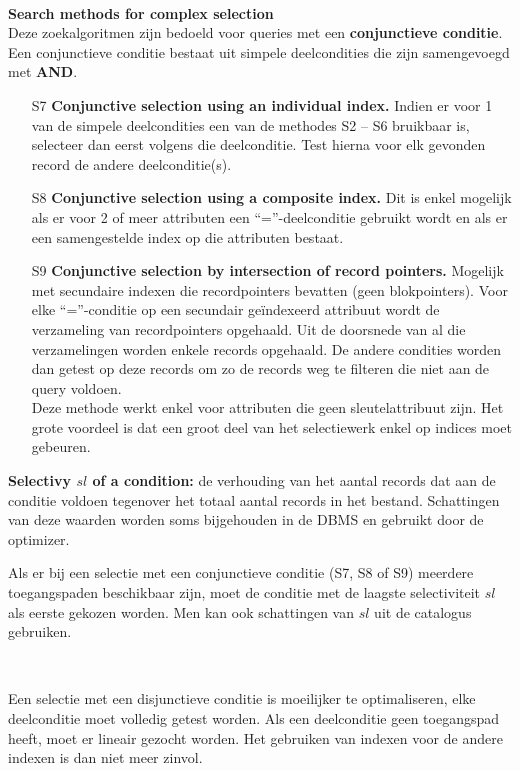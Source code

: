 ~

\noindent \textbf{Search methods for complex selection}\\
Deze zoekalgoritmen zijn bedoeld voor queries met een \textbf{conjunctieve conditie}. Een conjunctieve conditie bestaat uit simpele deelcondities die zijn samengevoegd met \textbf{AND}.
\begin{itemize}
	\item[S7] \textbf{Conjunctive selection using an individual index.} Indien er voor 1 van de simpele deelcondities een van de methodes S2 -- S6 bruikbaar is, selecteer dan eerst volgens die deelconditie. Test hierna voor elk gevonden record de andere deelconditie(s).
	
	\item[S8] \textbf{Conjunctive selection using a composite index.} Dit is enkel mogelijk als er voor 2 of meer attributen een ``=''-deelconditie gebruikt wordt en als er een samengestelde index op die attributen bestaat.

	\item[S9] \textbf{Conjunctive selection by intersection of record pointers.} Mogelijk met secundaire indexen die recordpointers bevatten (geen blokpointers). Voor elke ``=''-conditie op een secundair ge\"indexeerd attribuut wordt de verzameling van recordpointers opgehaald. Uit de doorsnede van al die verzamelingen worden enkele records opgehaald. De andere condities worden dan getest op deze records om zo de records weg te filteren die niet aan de query voldoen.\\	
Deze methode werkt enkel voor attributen die geen sleutelattribuut zijn. Het grote voordeel is dat een groot deel van het selectiewerk enkel op indices moet gebeuren.
\end{itemize}
\textbf{Selectivy $sl$ of a condition:} de verhouding van het aantal records dat aan de conditie voldoen tegenover het totaal aantal records in het bestand. Schattingen van deze waarden worden soms bijgehouden in de DBMS en gebruikt door de optimizer.

Als er bij een selectie met een conjunctieve conditie (S7, S8 of S9) meerdere toegangspaden beschikbaar zijn, moet de conditie met de laagste selectiviteit $sl$ als eerste gekozen worden. Men kan ook schattingen van $sl$ uit de catalogus gebruiken.

~

\noindent Een selectie met een disjunctieve conditie is moeilijker te optimaliseren, elke deelconditie moet volledig getest worden. Als een deelconditie geen toegangspad heeft, moet er lineair gezocht worden. Het gebruiken van indexen voor de andere indexen is dan niet meer zinvol.


